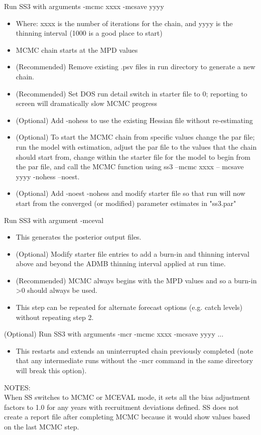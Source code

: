 \noindent Run SS3 with arguments -mcmc xxxx -mcsave yyyy
 \begin{itemize}
 	\item Where: xxxx is the number of iterations for the chain, and yyyy is the thinning interval (1000 is a good place to start)
 	\item MCMC chain starts at the MPD values
 	\item (Recommended) Remove existing .psv files in run directory to generate a new chain.
 	\item (Recommended) Set DOS run detail switch in starter file to 0; reporting to screen will dramatically slow MCMC progress
 	\item (Optional) Add -nohess to use the existing Hessian file without re-estimating
 	\item (Optional) To start the MCMC chain from specific values change the par file; run the model with estimation, adjust the par file to the values that the chain should start from, change within the starter file for the model to begin from the par file, and call the MCMC function using ss3 –mcmc xxxx – mcsave yyyy -nohess –noest.
 	\item (Optional) Add -noest -nohess and modify starter file so that run will now start from the converged (or modified) parameter estimates in "ss3.par"
 \end{itemize}
	
\noindent Run SS3 with argument -mceval
\begin{itemize}
	\item This generates the posterior output files.
	\item (Optional) Modify starter file entries to add a burn-in and thinning interval above and beyond the ADMB thinning interval applied at run time.
	\item (Recommended) MCMC always begins with the MPD values and so a burn-in >0 should always be used.
	\item This step can be repeated for alternate forecast options (e.g. catch levels) without repeating step 2.
\end{itemize}

\noindent (Optional) Run SS3 with arguments -mcr -mcmc xxxx -mcsave yyyy ...
\begin{itemize}
	\item This restarts and extends an uninterrupted chain previously completed (note that any intermediate runs without the -mcr command in the same directory will break this option).
\end{itemize}

\noindent NOTES:\\
When SS switches to MCMC or MCEVAL mode, it sets all the bias adjustment factors to 1.0 for any years with recruitment deviations defined.  SS does not create a report file after completing MCMC because it would show values based on the last MCMC step.


